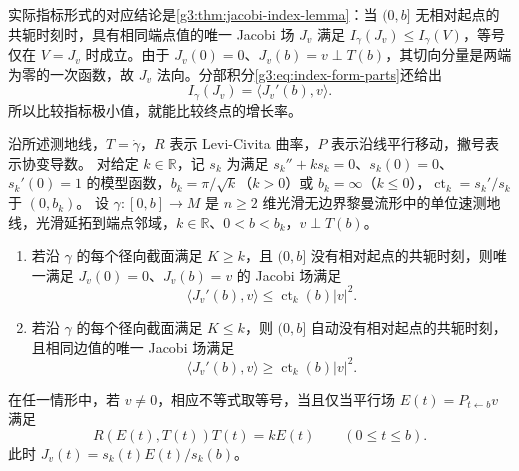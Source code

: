 实际指标形式的对应结论是\cref{g3:thm:jacobi-index-lemma}：当 \((0,b]\) 无相对起点的共轭时刻时，具有相同端点值的唯一 Jacobi 场 \(J_v\) 满足 \(I_\gamma(J_v)\le I_\gamma(V)\)，等号仅在 \(V=J_v\) 时成立。由于 \(J_v(0)=0\)、\(J_v(b)=v\perp T(b)\)，其切向分量是两端为零的一次函数，故 \(J_v\) 法向。分部积分\eqref{g3:eq:index-form-parts}还给出
\begin{equation}\label{g3:eq:jacobi-index-endpoint-value}
	I_\gamma(J_v)=\langle J_v'(b),v\rangle.
\end{equation}
所以比较指标极小值，就能比较终点的增长率。

\begin{proposition}\label{g3:prop:index-endpoint-comparison}
	沿所述测地线，\(T=\dot\gamma\)，\(R\) 表示 Levi-Civita 曲率，\(P\) 表示沿线平行移动，撇号表示协变导数。
	对给定 \(k\in\mathbb R\)，记 \(s_k\) 为满足 \(s_k''+ks_k=0\)、\(s_k(0)=0\)、\(s_k'(0)=1\) 的模型函数，\(b_k=\pi/\sqrt k\)（\(k>0\)）或 \(b_k=\infty\)（\(k\le0\)），\(\operatorname{ct}_k=s_k'/s_k\) 于 \((0,b_k)\)。
	设 \(\gamma:[0,b]\to M\) 是 \(n\ge2\) 维光滑无边界黎曼流形中的单位速测地线，光滑延拓到端点邻域，\(k\in\mathbb R\)、\(0<b<b_k\)，\(v\perp T(b)\)。
	\begin{enumerate}
		\item 若沿 \(\gamma\) 的每个径向截面满足 \(K\ge k\)，且 \((0,b]\) 没有相对起点的共轭时刻，则唯一满足 \(J_v(0)=0\)、\(J_v(b)=v\) 的 Jacobi 场满足
		\begin{equation}\label{g3:eq:index-endpoint-upper}
			\langle J_v'(b),v\rangle\le\operatorname{ct}_k(b)|v|^2.
		\end{equation}
		\item 若沿 \(\gamma\) 的每个径向截面满足 \(K\le k\)，则 \((0,b]\) 自动没有相对起点的共轭时刻，且相同边值的唯一 Jacobi 场满足
		\begin{equation}\label{g3:eq:index-endpoint-lower}
			\langle J_v'(b),v\rangle\ge\operatorname{ct}_k(b)|v|^2.
		\end{equation}
	\end{enumerate}
	在任一情形中，若 \(v\ne0\)，相应不等式取等号，当且仅当平行场 \(E(t)=P_{t\leftarrow b}v\) 满足
	\begin{equation}\label{g3:eq:index-endpoint-equality-curvature}
		R(E(t),T(t))T(t)=kE(t)\qquad(0\le t\le b).
	\end{equation}
	此时 \(J_v(t)=s_k(t)E(t)/s_k(b)\)。
\end{proposition}
